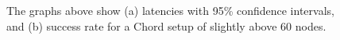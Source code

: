 \begin{figure}[htb]
  \centering
  \caption{The graphs above show (a) latencies with 95\% confidence intervals, and (b) success rate for a Chord setup of slightly above 60 nodes.}
\end{figure}

